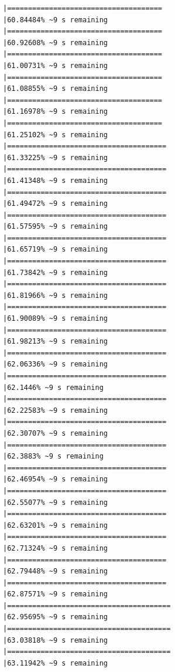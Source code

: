 \documentclass{article}\usepackage[]{graphicx}\usepackage[]{xcolor}
\makeatletter
\newenvironment{kframe}{%
 \def\at@end@of@kframe{}%
 \ifinner\ifhmode%
  \def\at@end@of@kframe{\end{minipage}}%
  \begin{minipage}{\columnwidth}%
 \fi\fi%
 \def\FrameCommand##1{\hskip\@totalleftmargin \hskip-\fboxsep
 \colorbox{shadecolor}{##1}\hskip-\fboxsep
     \hskip-\linewidth \hskip-\@totalleftmargin \hskip\columnwidth}%
 \MakeFramed {\advance\hsize-\width
   \@totalleftmargin\z@ \linewidth\hsize
   \@setminipage}}%
 {\par\unskip\endMakeFramed%
 \at@end@of@kframe}
\newenvironment{knitrout}{}{} %
\makeatother
\begin{document}
\begin{knitrout}
\begin{kframe}
\begin{verbatim}
|=====================================                         |60.84484% ~9 s remaining  
|=====================================                         |60.92608% ~9 s remaining  
|=====================================                         |61.00731% ~9 s remaining  
|=====================================                         |61.08855% ~9 s remaining  
|=====================================                         |61.16978% ~9 s remaining  
|=====================================                         |61.25102% ~9 s remaining  
|======================================                        |61.33225% ~9 s remaining  
|======================================                        |61.41348% ~9 s remaining  
|======================================                        |61.49472% ~9 s remaining  
|======================================                        |61.57595% ~9 s remaining  
|======================================                        |61.65719% ~9 s remaining  
|======================================                        |61.73842% ~9 s remaining  
|======================================                        |61.81966% ~9 s remaining  
|======================================                        |61.90089% ~9 s remaining  
|======================================                        |61.98213% ~9 s remaining  
|======================================                        |62.06336% ~9 s remaining  
|======================================                        |62.1446% ~9 s remaining   
|======================================                        |62.22583% ~9 s remaining  
|======================================                        |62.30707% ~9 s remaining  
|======================================                        |62.3883% ~9 s remaining   
|======================================                        |62.46954% ~9 s remaining  
|======================================                        |62.55077% ~9 s remaining  
|======================================                        |62.63201% ~9 s remaining  
|======================================                        |62.71324% ~9 s remaining  
|======================================                        |62.79448% ~9 s remaining  
|======================================                        |62.87571% ~9 s remaining  
|=======================================                       |62.95695% ~9 s remaining  
|=======================================                       |63.03818% ~9 s remaining  
|=======================================                       |63.11942% ~9 s remaining  

\end{verbatim}
\end{kframe}
\end{knitrout}
\end{document}
